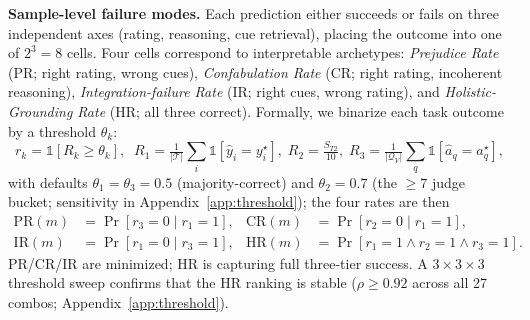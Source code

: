 \documentclass{article}
\begin{document}
\vspace{-0.2cm}
\noindent\textbf{Sample-level failure modes.} Each prediction either succeeds or fails on three independent axes (rating, reasoning, cue retrieval), placing the outcome into one of $2^3\!=\!8$ cells. Four cells correspond to interpretable archetypes: \emph{Prejudice Rate} (PR; right rating, wrong cues), \emph{Confabulation Rate} (CR; right rating, incoherent reasoning), \emph{Integration-failure Rate} (IR; right cues, wrong rating), and \emph{Holistic-Grounding Rate} (HR; all three correct). Formally, we binarize each task outcome by a threshold $\theta_k$:
\vspace{-0.2cm}
\begin{equation}
r_k = \mathbb{1}[R_k \geq \theta_k],\;\;
R_1 = \tfrac{1}{|\mathcal{T}|}\sum_i \mathbb{1}[\hat{y}_i = y_i^\star],\;
R_2 = \tfrac{S_{T2}}{10},\;
R_3 = \tfrac{1}{|\mathcal{Q}_V|}\sum_q \mathbb{1}[\hat{a}_q = a_q^\star],
\label{eq:rk}
\end{equation}
with defaults $\theta_1{=}\theta_3{=}0.5$ (majority-correct) and $\theta_2{=}0.7$ (the $\geq\!7$ judge bucket; sensitivity in Appendix~\ref{app:threshold}); the four rates are then
\begin{align}
\text{PR}(m) &\!=\! \Pr[r_3\!=\!0\!\mid\! r_1\!=\!1], &
\text{CR}(m) &\!=\! \Pr[r_2\!=\!0\!\mid\! r_1\!=\!1], \label{eq:PR}\\[-1pt]
\text{IR}(m) &\!=\! \Pr[r_1\!=\!0\!\mid\! r_3\!=\!1], &
\text{HR}(m) &\!=\! \Pr[r_1\!=\!1 \!\wedge\! r_2\!=\!1 \!\wedge\! r_3\!=\!1]. \label{eq:HR}
\end{align}
PR/CR/IR are minimized; HR is capturing full three-tier success. 
A $3\!\times\!3\!\times\!3$ threshold sweep confirms that the HR ranking is stable ($\rho\!\geq\!0.92$ across all 27 combos; Appendix~\ref{app:threshold}).
\end{document}
